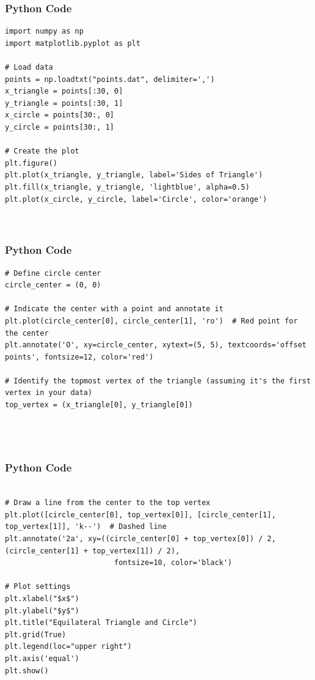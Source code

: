 \documentclass{beamer}
\begin{document}
\begin{frame}[fragile]
  \frametitle{Python Code }

\begin{verbatim}
import numpy as np
import matplotlib.pyplot as plt

# Load data
points = np.loadtxt("points.dat", delimiter=',')
x_triangle = points[:30, 0]
y_triangle = points[:30, 1]
x_circle = points[30:, 0]
y_circle = points[30:, 1]

# Create the plot
plt.figure()
plt.plot(x_triangle, y_triangle, label='Sides of Triangle')
plt.fill(x_triangle, y_triangle, 'lightblue', alpha=0.5)
plt.plot(x_circle, y_circle, label='Circle', color='orange')



\end{verbatim}
\end{frame}
\begin{frame}[fragile]
  \frametitle{Python Code }

\begin{verbatim}
# Define circle center
circle_center = (0, 0)

# Indicate the center with a point and annotate it
plt.plot(circle_center[0], circle_center[1], 'ro')  # Red point for the center
plt.annotate('O', xy=circle_center, xytext=(5, 5), textcoords='offset points', fontsize=12, color='red')

# Identify the topmost vertex of the triangle (assuming it's the first vertex in your data)
top_vertex = (x_triangle[0], y_triangle[0])


                         
\end{verbatim}
\end{frame}

\begin{frame}[fragile]
  \frametitle{Python Code }
\begin{verbatim}

# Draw a line from the center to the top vertex
plt.plot([circle_center[0], top_vertex[0]], [circle_center[1], top_vertex[1]], 'k--')  # Dashed line
plt.annotate('2a', xy=((circle_center[0] + top_vertex[0]) / 2, (circle_center[1] + top_vertex[1]) / 2), 
                         fontsize=10, color='black')
                         
# Plot settings
plt.xlabel("$x$")
plt.ylabel("$y$")
plt.title("Equilateral Triangle and Circle")
plt.grid(True)
plt.legend(loc="upper right")
plt.axis('equal')
plt.show()

\end{verbatim}
\end{frame}
\end{document}
